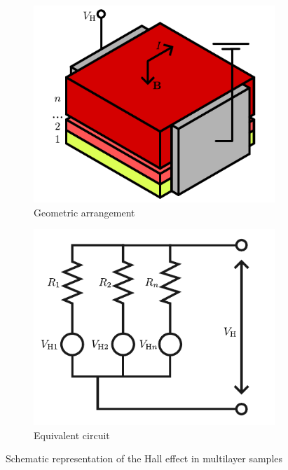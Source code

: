 \begin{figure}
	\centering
	\begin{subfigure}{0.45\linewidth}
			\centering
			\includegraphics[width=\linewidth]{../assets/multilayer_hall_1.pdf}
			\caption{Geometric arrangement}
			\label{fig:multilayer_hall_1}
		\end{subfigure}
		\begin{subfigure}{0.45\linewidth}
			\centering
			\includegraphics[width=\linewidth]{../assets/multilayer_hall_2.pdf}
			\caption{Equivalent circuit}
			\label{fig:multilayer_hall_2}
		\end{subfigure}
	\caption{Schematic representation of the Hall effect in multilayer samples}
	\label{fig:multilayer_hall}
\end{figure}

